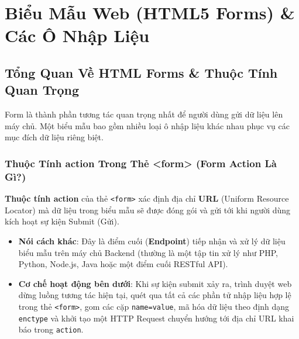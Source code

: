 \documentclass[11pt,oneside]{book}
\newcommand{\codeinline}[1]{\textcolor{accentOrange}{\texttt{#1}}}
\newcommand{\term}[1]{\textbf{\textcolor{primaryBlue}{#1}}}
\begin{document}
\chapter{Biểu Mẫu Web (HTML5 Forms) \& Các Ô Nhập Liệu}
\label{chap:forms_accessibility}

\section{Tổng Quan Về HTML Forms \& Thuộc Tính Quan Trọng}
Form là thành phần tương tác quan trọng nhất để người dùng gửi dữ liệu lên máy chủ. Một biểu mẫu bao gồm nhiều loại ô nhập liệu khác nhau phục vụ các mục đích dữ liệu riêng biệt.

\subsection{Thuộc Tính action Trong Thẻ <form> (Form Action Là Gì?)}
\label{subsec:form_action}

\begin{conceptBox}
\term{Thuộc tính action} của thẻ \codeinline{<form>} xác định địa chỉ \term{URL} (Uniform Resource Locator) mà dữ liệu trong biểu mẫu sẽ được đóng gói và gửi tới khi người dùng kích hoạt sự kiện Submit (Gửi).
\begin{itemize}[leftmargin=1.5em, itemsep=2pt, parsep=0pt]
    \item \textbf{Nói cách khác}: Đây là điểm cuối (\term{Endpoint}) tiếp nhận và xử lý dữ liệu biểu mẫu trên máy chủ Backend (thường là một tập tin xử lý như PHP, Python, Node.js, Java hoặc một điểm cuối RESTful API).
    \item \textbf{Cơ chế hoạt động bên dưới}: Khi sự kiện submit xảy ra, trình duyệt web dừng luồng tương tác hiện tại, quét qua tất cả các phần tử nhập liệu hợp lệ trong thẻ \codeinline{<form>}, gom các cặp \codeinline{name=value}, mã hóa dữ liệu theo định dạng \codeinline{enctype} và khởi tạo một HTTP Request chuyển hướng tới địa chỉ URL khai báo trong \codeinline{action}.
\end{itemize}
\end{conceptBox}
\end{document}
